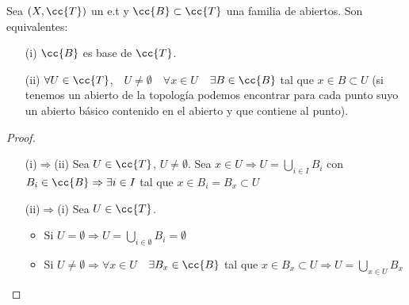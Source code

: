 \begin{prop}
    Sea $(X,\cc{T})$ un e.t y $\cc{B}\subset \cc{T}$ una familia de abiertos. Son equivalentes:
    \begin{enumerate}
        \item[(i)] $\cc{B}$ es base de $\cc{T}$.
        \item[(ii)] $\forall U \in \cc{T}$,\ \ $U \neq \emptyset$\ \ $\forall x\in U$\ \ $\exists B \in \cc{B}$ tal que $x\in B \subset U$ (si tenemos un abierto de la topología podemos encontrar para cada punto suyo un abierto básico contenido en el abierto y que contiene al punto).
    \end{enumerate}

    \begin{proof}\
        \begin{itemize}
            \item[(i)$\Rightarrow$(ii)] Sea $U\in \cc{T}$, $U\neq \emptyset$. Sea $x \in U \Rightarrow  U = \bigcup\limits_{i\in I}B_i$ con $B_i \in \cc{B}\Rightarrow \exists i\in I$ tal que $x\in B_i=B_x\subset U$
            \item[(ii)$\Rightarrow$(i)] Sea $U\in \cc{T}$.
            \begin{itemize}[label=-]
                \item Si $U=\emptyset\Rightarrow U=\bigcup\limits_{i\in \emptyset}B_i=\emptyset$
                \item Si $U \neq \emptyset \Rightarrow \forall x \in U$\ \ $\exists B_x\in \cc{B}$ tal que $x\in B_x \subset U\Rightarrow U = \bigcup\limits_{x\in U}B_x$
            \end{itemize}
        \end{itemize} 
    \end{proof}
\end{prop}



